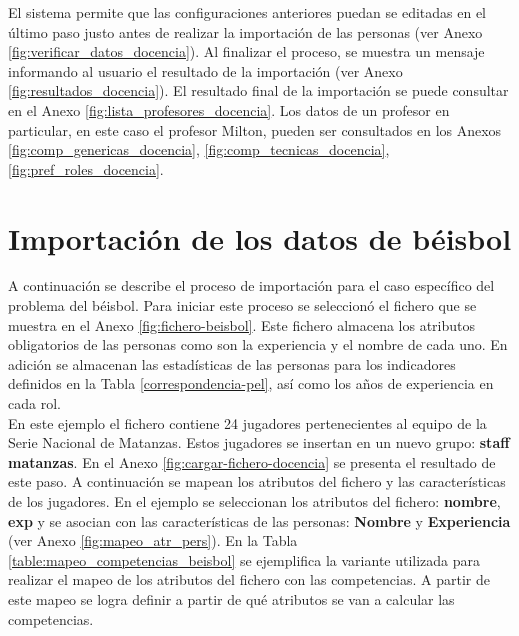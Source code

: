 El sistema permite que las configuraciones anteriores puedan se editadas en el último paso justo antes de realizar la importación de las personas (ver Anexo \ref{fig:verificar_datos_docencia}). Al finalizar el proceso, se muestra un mensaje informando al usuario el resultado de la importación (ver Anexo \ref{fig:resultados_docencia}). El resultado final de la importación se puede consultar en el Anexo \ref{fig:lista_profesores_docencia}. Los datos de un profesor en particular, en este caso el profesor Milton, pueden ser consultados en los Anexos \ref{fig:comp_genericas_docencia}, \ref{fig:comp_tecnicas_docencia}, \ref{fig:pref_roles_docencia}.

\section{Importación de los datos de  béisbol} \label{sec:impo_beisbol}
A continuación se describe el proceso de importación para el caso específico del problema del béisbol. Para iniciar este proceso se seleccionó el fichero que se muestra en el Anexo \ref{fig:fichero-beisbol}. Este fichero almacena los atributos obligatorios de las personas como son la experiencia y el nombre de cada uno. En adición se almacenan las estadísticas de las personas para los indicadores definidos en la Tabla \ref{correspondencia-pel}, así como los años de experiencia en cada rol.\\

En este ejemplo el fichero contiene 24 jugadores pertenecientes al equipo de la Serie Nacional de Matanzas. Estos jugadores se insertan en un nuevo grupo: \textbf{staff matanzas}. En el Anexo \ref{fig:cargar-fichero-docencia} se presenta el resultado de este paso. A continuación se mapean los atributos del fichero y las características de los jugadores. En el ejemplo se seleccionan los atributos del fichero: \textbf{nombre}, \textbf{exp} y se asocian con las características de las personas: \textbf{Nombre} y \textbf{Experiencia} (ver Anexo \ref{fig:mapeo_atr_pers}). En la Tabla \ref{table:mapeo_competencias_beisbol} se ejemplifica la variante utilizada para realizar el mapeo de los atributos del fichero con las competencias. A partir de este mapeo se logra definir a partir de qué atributos se van a calcular las competencias.

